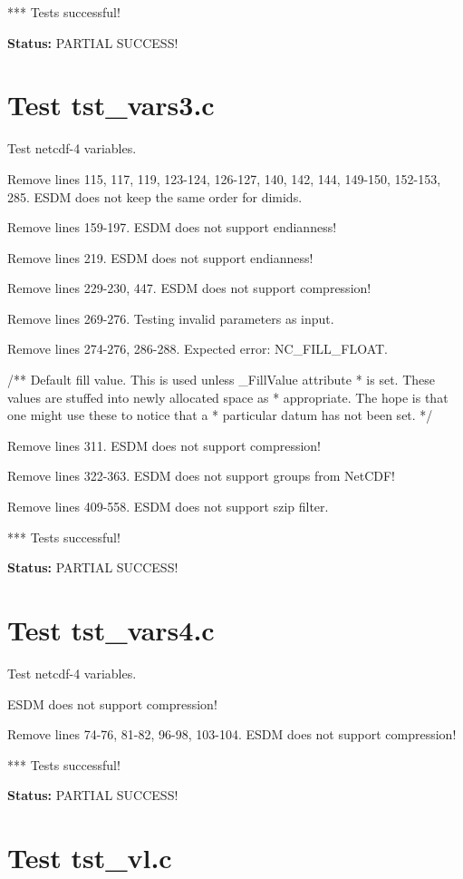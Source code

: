 *** Tests successful!

{\bf \large Status: } PARTIAL SUCCESS!

\section{Test tst\_vars3.c}

Test netcdf-4 variables.

Remove lines 115, 117, 119, 123-124, 126-127, 140, 142, 144, 149-150, 152-153, 285. ESDM does not keep the same order for dimids.

Remove lines 159-197. ESDM does not support endianness!

Remove lines 219. ESDM does not support endianness!

Remove lines 229-230, 447. ESDM does not support compression!

Remove lines 269-276. Testing invalid parameters as input.

Remove lines 274-276, 286-288. Expected error: NC\_FILL\_FLOAT.

/** Default fill value. This is used unless \_FillValue attribute
 * is set.  These values are stuffed into newly allocated space as
 * appropriate.  The hope is that one might use these to notice that a
 * particular datum has not been set. */

Remove lines 311. ESDM does not support compression!

Remove lines 322-363. ESDM does not support groups from NetCDF!

Remove lines 409-558. ESDM does not support szip filter.

*** Tests successful!

{\bf \large Status: } PARTIAL SUCCESS!

\section{Test tst\_vars4.c}

Test netcdf-4 variables.

ESDM does not support compression!

Remove lines 74-76, 81-82, 96-98, 103-104. ESDM does not support compression!

*** Tests successful!

{\bf \large Status: } PARTIAL SUCCESS!

\section{Test tst\_vl.c}

